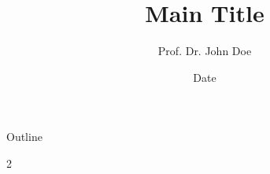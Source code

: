 \documentclass[10pt,compress]{beamer} %
\title[Your Short Title]{Main Title}
\author{Prof. Dr. John Doe}
\institute{Departamento de Automática}
\date{Date}
\begin{document}
{\titlepageBlue
    \begin{frame}
        \titlepage
    \end{frame}
}

{\titlepageWhite
    \begin{frame}
        \titlepage
    \end{frame}
}

{
    \begin{frame}[shrink]{Outline}
	    \begin{multicols}{2}
        	\tableofcontents
 	    \end{multicols}
    \end{frame}
}

\addtocounter{framenumber}{-1} %

\end{document}
